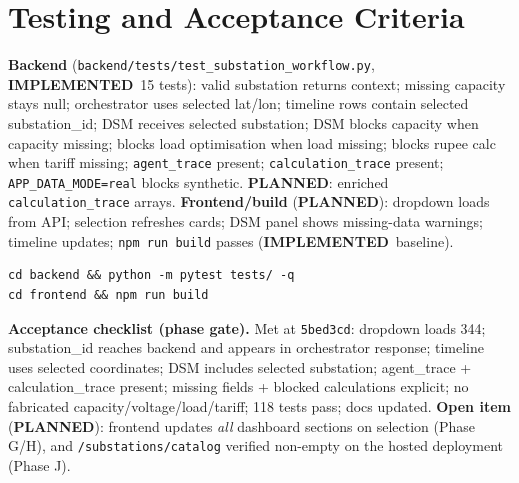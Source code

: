 \documentclass[11pt,a4paper]{article}
\newcommand{\stImpl}{\textcolor{cok}{\textbf{IMPLEMENTED}}}
\newcommand{\stPlan}{\textcolor{cplan}{\textbf{PLANNED}}}
\newcommand{\code}[1]{\texttt{\small #1}}
\begin{document}
\section{Testing and Acceptance Criteria}
\textbf{Backend} (\code{backend/tests/test\_substation\_workflow.py}, \stImpl\ 15 tests):
valid substation returns context; missing capacity stays null; orchestrator uses selected lat/lon;
timeline rows contain selected substation\_id; DSM receives selected substation; DSM blocks
capacity when capacity missing; blocks load optimisation when load missing; blocks rupee calc when
tariff missing; \code{agent\_trace} present; \code{calculation\_trace} present;
\code{APP\_DATA\_MODE=real} blocks synthetic. \stPlan: enriched \code{calculation\_trace} arrays.
\textbf{Frontend/build} (\stPlan): dropdown loads from API; selection refreshes cards; DSM panel
shows missing-data warnings; timeline updates; \code{npm run build} passes (\stImpl\ baseline).

\begin{lstlisting}
cd backend && python -m pytest tests/ -q
cd frontend && npm run build
\end{lstlisting}

\noindent\textbf{Acceptance checklist (phase gate).} Met at \code{5bed3cd}: dropdown loads 344;
substation\_id reaches backend and appears in orchestrator response; timeline uses selected
coordinates; DSM includes selected substation; agent\_trace + calculation\_trace present; missing
fields + blocked calculations explicit; no fabricated capacity/voltage/load/tariff; 118 tests pass;
docs updated. \textbf{Open item} (\stPlan): frontend updates \emph{all} dashboard sections on
selection (Phase G/H), and \code{/substations/catalog} verified non-empty on the hosted deployment
(Phase J).

\end{document}
